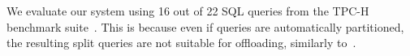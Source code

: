We evaluate our system using 16 out of 22 SQL queries from the TPC-H benchmark suite~\cite{tpch-benchmark}. This is because even if queries are automatically partitioned, the resulting split queries are not suitable for offloading, similarly to~\cite{246154,Koo:2017:STC:3123939.3124553,Gu:2016:BFN:3001136.3001154}.
%


